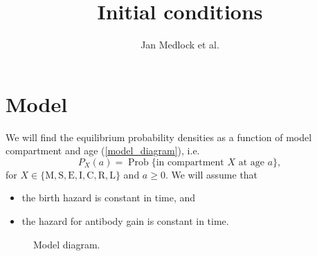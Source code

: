 \documentclass[12pt]{article}
\title{Initial conditions}
\author{Jan Medlock et al.}
\DeclareMathOperator{\Prob}{Prob}
\begin{document}
\maketitle

\section{Model}

We will find the equilibrium probability densities as a function of
model compartment and age (\autoref{model_diagram}), i.e.
\begin{equation}
  P_X(a) = \Prob\{\text{in compartment $X$ at age $a$}\},
\end{equation}
for $X \in \{\mathrm{M}, \mathrm{S}, \mathrm{E}, \mathrm{I},
\mathrm{C}, \mathrm{R}, \mathrm{L}\}$
and $a \geq 0$.
We will assume that
\begin{itemize}
\item the birth hazard is constant in time, and
\item the hazard for antibody gain is constant in time.
\end{itemize}

\begin{figure}
  \begin{center}
    
  \end{center}
  \caption{Model diagram.}
  \label{model_diagram}
\end{figure}

\clearpage
\end{document}
